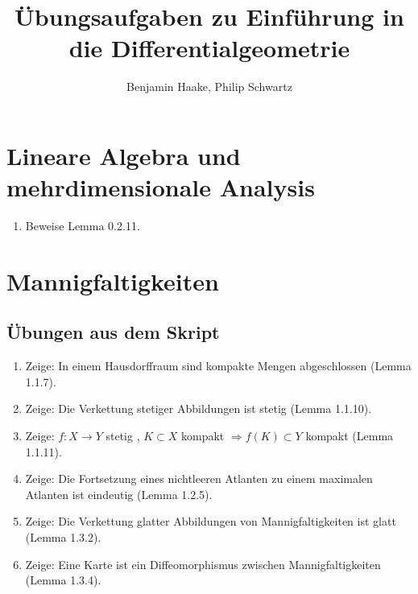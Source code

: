 \documentclass[a4paper,headsepline,headheight=30pt,numbers=enddot]{scrartcl}
\title{Übungsaufgaben zu \glqq Einführung in die Differentialgeometrie\grqq}
\author{Benjamin Haake, Philip Schwartz}
\date{}
\begin{document}
\setcounter{section}{-1}
	\section[LinA und Ana]{Lineare Algebra und mehrdimensionale Analysis}
	\begin{enumerate}
		\item Beweise Lemma 0.2.11.
	\end{enumerate}

	\newpage
	\section{Mannigfaltigkeiten}
	\subsection*{Übungen aus dem Skript}
	\begin{enumerate}
		\item Zeige: In einem Hausdorffraum sind kompakte Mengen abgeschlossen (Lemma 1.1.7).
		\item Zeige: Die Verkettung stetiger Abbildungen ist stetig (Lemma 1.1.10).
		\item Zeige: $f\colon X\rightarrow Y$ stetig , $K\subset X$ kompakt $\Rightarrow f(K)\subset Y$ kompakt (Lemma 1.1.11).
		\item Zeige: Die Fortsetzung eines nichtleeren Atlanten zu einem maximalen Atlanten ist eindeutig (Lemma 1.2.5).
		\item Zeige: Die Verkettung glatter Abbildungen von Mannigfaltigkeiten ist glatt (Lemma 1.3.2).
		\item Zeige: Eine Karte ist ein Diffeomorphismus zwischen Mannigfaltigkeiten (Lemma 1.3.4).
	\end{enumerate}
\end{document}

